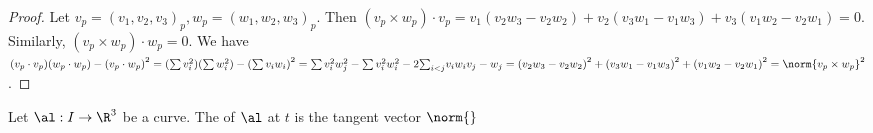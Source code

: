 \documentclass[10pt]{article}
\begin{document}
\begin{proof}
    Let ${v}_{p}={({v}_{1},{v}_{2},{v}_{3})}_{p},{w}_{p}={({w}_{1},{w}_{2},{w}_{3})}_{p}$. Then $({v}_{p}\times{w}_{p})\cdot{v}_{p}={v}_{1}({v}_{2}{w}_{3}-{v}_{2}{w}_{2})+{v}_{2}({v}_{3}{w}_{1}-{v}_{1}{w}_{3})+{v}_{3}({v}_{1}{w}_{2}-{v}_{2}{w}_{1})=0$. Similarly, $({v}_{p}\times{w}_{p})\cdot{w}_{p}=0$. We have $({v}_{p}\cdot{v}_{p})({w}_{p}\cdot{w}_{p})-{({v}_{p}\cdot{w}_{p})}^{2}=(\sum{v}_{i}^{2})(\sum{w}_{i}^{2})-{(\sum{v}_{i}{w}_{i})}^{2}=\sum{v}_{i}^{2}{w}_{j}^{2}-\sum{v}_{i}^{2}{w}_{i}^{2}-2{\sum}_{i<j}{v}_{i}{w}_{i}{v}_{j}-{w}_{j}={({v}_{2}{w}_{3}-{v}_{2}{w}_{2})}^{2}+{({v}_{3}{w}_{1}-{v}_{1}{w}_{3})}^{2}+{({v}_{1}{w}_{2}-{v}_{2}{w}_{1})}^{2}={\norm{{v}_{p}\times{w}_{p}}}^{2}$.
\end{proof}
\begin{definition}
    Let $\al:I\to{\R}^{3}$ be a curve. The  of $\al$ at $t$ is the tangent vector $\norm{}$
\end{definition}





\hindex
\end{document}
